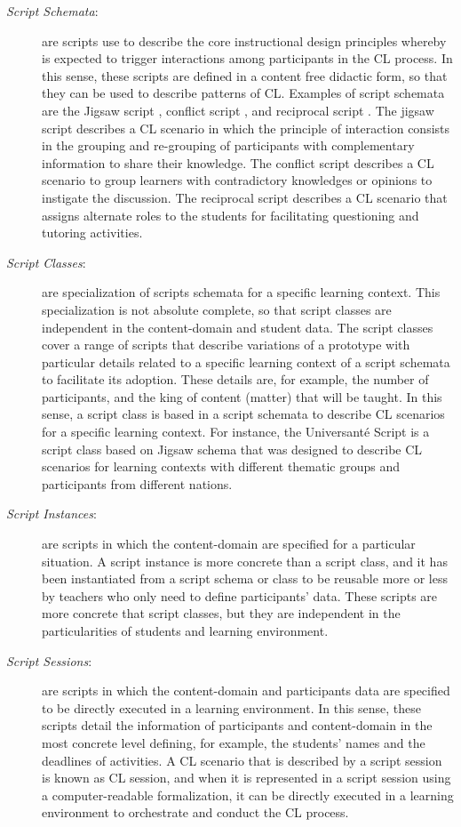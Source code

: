 \begin{description}
\item[\emph{Script Schemata}:] are scripts use to describe the core instructional design principles whereby is expected to trigger interactions among participants in the CL process. In this sense, these scripts are defined in a content free didactic form, so that they can be used to describe patterns of CL. Examples of script schemata are the Jigsaw script \cite{Aronson1978, KordakiSiempos2010}, conflict script \cite{WeinbergerErtlFischerMandl2005}, and reciprocal script \cite{King2007}. The jigsaw script describes a CL scenario in which the principle of interaction consists in the grouping and re-grouping of participants with complementary information to share their knowledge. The conflict script describes a CL scenario to group learners with contradictory knowledges or opinions to instigate the discussion. The reciprocal script describes a CL scenario that assigns alternate roles to the students for facilitating questioning and tutoring activities.

\item[\emph{Script Classes}:] are specialization of scripts schemata for a specific learning context. This specialization is not absolute complete, so that script classes are independent in the content-domain and student data. The script classes cover a range of scripts that describe variations of a prototype with particular details related to a specific learning context of a script schemata to facilitate its adoption. These details are, for example, the number of participants, and the king of content (matter) that will be taught. In this sense, a script class is based in a script schemata to describe CL scenarios for a specific learning context. For instance, the Universanté Script \cite{DillenbourgJermann2007} is a script class based on Jigsaw schema that was designed to describe CL scenarios for learning contexts with different thematic groups and participants from different nations.

\item[\emph{Script Instances}:] are scripts in which the content-domain are specified for a particular situation. A script instance is more concrete than a script class, and it has been instantiated from a script schema or class to be reusable more or less by teachers who only need to define participants' data. These scripts are more concrete that script classes, but they are independent in the particularities of students and learning environment.

\item[\emph{Script Sessions}:] are scripts in which the content-domain and participants data are specified to be directly executed in a learning environment. In this sense, these scripts detail the information of participants and content-domain in the most concrete level defining, for example, the students' names and the deadlines of activities. A CL scenario that is described by a script session is known as CL session, and when it is represented in a script session using a computer-readable formalization, it can be directly executed in a learning environment to orchestrate and conduct the CL process.
\end{description}

